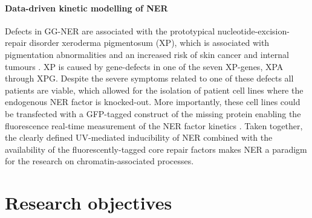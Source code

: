 \paragraph{Data-driven kinetic modelling of NER}
Defects in GG-NER are associated with the prototypical nucleotide-excision-repair disorder xeroderma pigmentosum (XP), which is associated with pigmentation abnormalities and an increased risk of skin cancer and internal tumours \cite{Hoeijmakers2009}. XP is caused by gene-defects in one of the seven XP-genes, XPA through XPG. Despite the severe symptoms related to one of these defects all patients are viable, which allowed for the isolation of patient cell lines where the endogenous NER factor is knocked-out. More importantly, these cell lines could be transfected with a GFP-tagged construct of the missing protein enabling the fluorescence real-time measurement of the NER factor kinetics \cite{Hoogstraten2002,Hoogstraten2008,Zotter2006,Rademakers2003}. Taken together, the clearly defined UV-mediated inducibility of NER combined with the availability of the fluorescently-tagged core repair factors makes NER a paradigm for the research on chromatin-associated processes.\\


\section{Research objectives}

